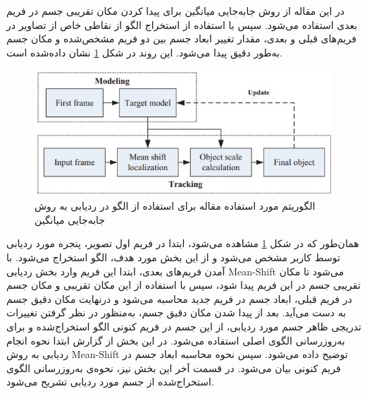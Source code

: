 \documentclass[paper=a4, fontsize=12pt]{article} %
\begin{document}
در این مقاله از روش جابه‌جایی میانگین برای پیدا کردن مکان تقریبی جسم در فریم بعدی استفاده می‌شود. سپس با استفاده از استخراج الگو از نقاطی خاص از تصاویر در فریم‌های قبلی و بعدی، مقدار تغییر ابعاد جسم بین دو فریم مشخص‌شده و مکان جسم به‌طور دقیق پیدا می‌شود. این روند در شکل \ref{pic-2} نشان داده‌شده است.
\begin{figure}[h]
\centering
\includegraphics[scale=0.8]{fig2.jpg}
\caption{الگوریتم مورد استفاده مقاله برای استفاده از الگو در ردیابی به روش جابه‌جایی میانگین}
\label{pic-2}
\end{figure}
همان‌طور که در شکل \ref{pic-2} مشاهده می‌شود، ابتدا در فریم اول تصویر، پنجره مورد ردیابی توسط کاربر مشخص می‌شود و از این بخش مورد هدف، الگو استخراج می‌شود. با آمدن فریم‌های بعدی، ابتدا این فریم وارد بخش ردیابی Mean-Shift می‌شود تا مکان تقریبی جسم در این فریم پیدا شود، سپس با استفاده از این مکان تقریبی و مکان جسم در فریم قبلی، ابعاد جسم در فریم جدید محاسبه می‌شود و درنهایت مکان دقیق جسم به دست می‌آید. بعد از پیدا شدن مکان دقیق جسم، به‌منظور در نظر گرفتن تغییرات تدریجی ظاهر جسم مورد ردیابی، از این جسم در فریم کنونی الگو استخراج‌شده و برای به‌روزرسانی الگوی اصلی استفاده می‌شود.
در این بخش از گزارش ابتدا نحوه انجام ردیابی به روش Mean-Shift توضیح داده می‌شود. سپس نحوه محاسبه ابعاد جسم در فریم کنونی بیان می‌شود. در قسمت آخر این بخش نیز، نحوه‌ی به‌روزرسانی الگوی استخراج‌شده از جسم مورد ردیابی تشریح می‌شود.
\end{document}
